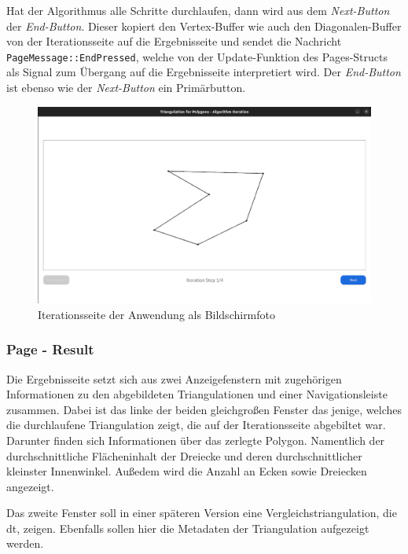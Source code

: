 Hat der Algorithmus alle Schritte durchlaufen, dann wird aus dem \emph{Next-Button} der \emph{End-Button}. Dieser kopiert den Vertex-Buffer wie auch den Diagonalen-Buffer von der Iterationsseite auf die Ergebnisseite 
und sendet die Nachricht \lstinline{PageMessage::EndPressed}, welche von der Update-Funktion des Pages-Structs als Signal zum Übergang auf die Ergebnisseite interpretiert wird. Der \emph{End-Button} ist ebenso wie der 
\emph{Next-Button} ein Primärbutton.

\begin{figure}[h]
    \centering
    \includegraphics[width=1\textwidth]{bilder/iteration_final.png}
    \caption[Iterationsseite der Anwendung]{Iterationsseite der Anwendung als Bildschirmfoto}
\end{figure}

\subsubsection{Page - Result}

Die Ergebnisseite setzt sich aus zwei Anzeigefenstern mit zugehörigen Informationen zu den abgebildeten Triangulationen und einer Navigationsleiste zusammen.
Dabei ist das linke der beiden gleichgroßen Fenster das jenige, welches die durchlaufene Triangulation zeigt, die auf der Iterationsseite abgebiltet war. Darunter finden sich 
Informationen über das zerlegte Polygon. Namentlich der durchschnittliche Flächeninhalt der Dreiecke und deren durchschnittlicher kleinster Innenwinkel. Außedem wird die Anzahl an Ecken sowie Dreiecken angezeigt.

Das zweite Fenster soll in einer späteren Version eine Vergleichstriangulation, die \ac{dt}, zeigen. Ebenfalls sollen hier die Metadaten der Triangulation aufgezeigt werden.

